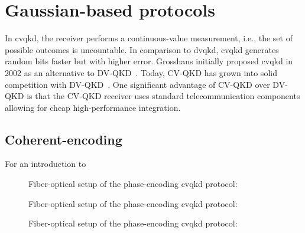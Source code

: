 \section{Gaussian-based protocols}

In \gls{cvqkd}, the receiver performs a continuous-value measurement, i.e., the set of possible outcomes is uncountable.
In comparison to \gls{dvqkd}, \gls{cvqkd} generates random bits faster but with higher error.
Grosshans initially proposed \gls{cvqkd} in 2002 as an alternative to DV-QKD~\cite{Grosshans2002}.
Today, CV-QKD has grown into solid competition with DV-QKD~\cite{Diamanti2016}.
One significant advantage of CV-QKD over DV-QKD is that the CV-QKD receiver uses standard telecommunication components allowing for cheap high-performance integration.

\subsection{Coherent-encoding}
For an introduction to 



\begin{figure}[htb]
	\centering
	
	\caption{Fiber-optical setup of the phase-encoding \gls{cvqkd} protocol:}
\end{figure}

\begin{figure}[htb]
	\centering
	
	\caption{Fiber-optical setup of the phase-encoding \gls{cvqkd} protocol:}
\end{figure}

\begin{figure}[htb]
	\centering
	
	\caption{Fiber-optical setup of the phase-encoding \gls{cvqkd} protocol:}
\end{figure}


